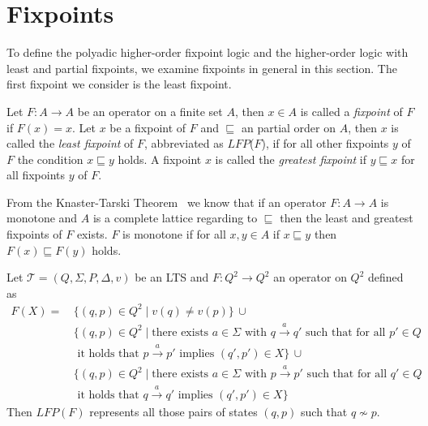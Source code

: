 
\section{Fixpoints}\label{sec:fixpoints}

To define the polyadic higher-order fixpoint logic and the higher-order logic with least and partial fixpoints, we examine fixpoints in general in this section. The first fixpoint we consider is the least fixpoint.

\begin{definition}
   Let $F\colon A \rightarrow A$ be an operator on a finite set $A$, then $x \in A$
   is called a \emph{fixpoint} of $F$ if $F(x) = x$. Let $x$ be a fixpoint of $F$ and $\sqsubseteq$ an partial order on $A$, then $x$ is called the \emph{least
   fixpoint} of $F$, abbreviated as $\mathit{LFP}$($F$), if for all other fixpoints $y$ of $F$ the condition $x
   \sqsubseteq y$ holds. A fixpoint $x$ is called the \emph{greatest fixpoint} if $y \sqsubseteq x$ for all fixpoints $y$ of $F$.
\end{definition}

From the Knaster-Tarski Theorem~\cite{tarski1955lattice} we know that if an operator $F\colon A \rightarrow 
A$ is monotone and $A$ is a complete lattice regarding to $\sqsubseteq$ then the least and greatest fixpoints of $F$ exists. $F$ is monotone if for all $x, y
 \in A$ if $x \sqsubseteq y$ then $F(x) \sqsubseteq F(y)$ holds.

\begin{example}
    \label{example:lfp} Let $\mathcal{T} = (Q, \Sigma, P, \Delta, v)$ be an LTS and $F: Q^2 \rightarrow Q^2$ an operator on $Q^2$ defined as 
\begin{align*}
    F(X) =\, &\{(q, p) \in Q^2 \mid v(q) \neq v(p)\}\, \cup \\&
    \{(q,p) \in Q^2 \mid \text{there exists } a\in\Sigma \text{ with } q\overset{a}{\rightarrow} q' \text{ such that for all } p' \in Q \\&\text{ it holds that } p\overset{a}{\rightarrow} p' \text{ implies } (q', p') \in X\}\,\cup \\&\{(q,p) \in Q^2 \mid  \text{there exists } a\in\Sigma \text{ with } p\overset{a}{\rightarrow} p' \text{ such that for all } q' \in Q \\&\text{ it holds that } q\overset{a}{\rightarrow} q' \text{ implies } (q', p') \in X\}
\end{align*}   
Then $LFP(F)$ represents all those pairs of states $(q, p)$ such that $q\not\sim p$.
\end{example}

